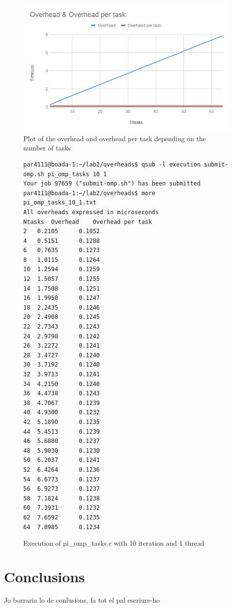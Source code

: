 \documentclass[12]{article}
\begin{document}
\begin{figure}[H]
\centering
\includegraphics[scale=0.5]{images/task.png}
\caption{Plot of the overhead and overhead per task depending on the number of tasks}
\label{overheadplot2}
\end{figure}



\begin{figure}[H]
\begin{lstlisting}[frame=single]
par4111@boada-1:~/lab2/overheads$ qsub -l execution submit-omp.sh pi_omp_tasks 10 1
Your job 97659 ("submit-omp.sh") has been submitted
par4111@boada-1:~/lab2/overheads$ more pi_omp_tasks_10_1.txt 
All overheads expressed in microseconds
Ntasks	Overhead	Overhead per task
2	0.2105		0.1052
4	0.5151		0.1288
6	0.7635		0.1273
8	1.0115		0.1264
10	1.2594		0.1259
12	1.5057		0.1255
14	1.7508		0.1251
16	1.9950		0.1247
18	2.2435		0.1246
20	2.4908		0.1245
22	2.7343		0.1243
24	2.9798		0.1242
26	3.2272		0.1241
28	3.4727		0.1240
30	3.7192		0.1240
32	3.9713		0.1241
34	4.2150		0.1240
36	4.4738		0.1243
38	4.7067		0.1239
40	4.9300		0.1232
42	5.1890		0.1235
44	5.4513		0.1239
46	5.6880		0.1237
48	5.9030		0.1230
50	6.2037		0.1241
52	6.4264		0.1236
54	6.6773		0.1237
56	6.9273		0.1237
58	7.1824		0.1238
60	7.3931		0.1232
62	7.6592		0.1235
64	7.8985		0.1234
\end{lstlisting}
\caption{Execution of pi\_omp\_tasks.c with 10 iteration and 1 thread}
\label{piqueuetask}
\end{figure}


\section{Conclusions}
Jo borraria lo de conlusions, fa tot el pal escriure-ho
\end{document}

